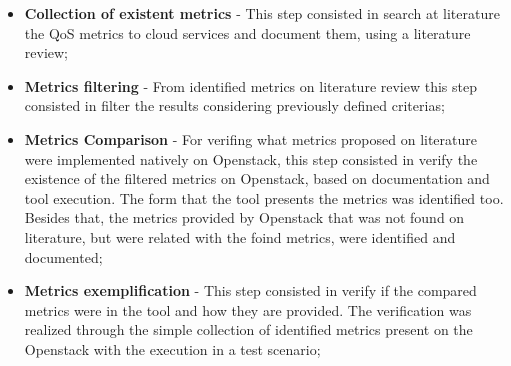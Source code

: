 \documentclass[conference]{IEEEtran}
\begin{document}
\begin{itemize}
 
 \item \textbf{Collection of existent metrics} - This step consisted in search at literature the QoS metrics to cloud services and document them, using a literature review;

  
 \item \textbf{Metrics filtering} - From identified metrics on literature review this step consisted in
 filter the results considering previously defined criterias;



  \item \textbf{Metrics Comparison} - For verifing what metrics proposed on literature were implemented natively
  on Openstack, this step consisted in verify the existence of the filtered metrics on Openstack, based on documentation and tool execution. The form that the tool presents the metrics was identified too. Besides that, the metrics provided by Openstack that was not found on literature, but were related with the foind metrics, were identified and documented;
 
 \item \textbf{Metrics exemplification} - This step consisted in verify if the compared metrics were in
 the tool and how they are provided. The verification was realized through the simple collection of identified metrics present on the Openstack with the execution in a test scenario;


\end{itemize}
\end{document}
